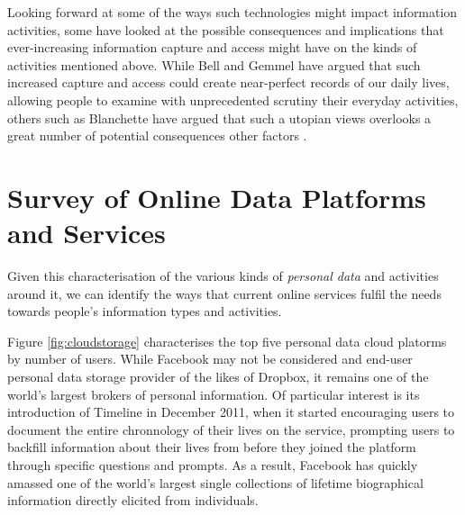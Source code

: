 \documentclass[runningheads,a4paper]{llncs}
\begin{document}
Looking forward at some of the ways such technologies might impact information activities, some have looked at the possible consequences and implications that ever-increasing information capture and access might have on the kinds of activities mentioned above.  While Bell and Gemmel have argued \cite{totalrecall} that such increased capture and access could create near-perfect records of our daily lives, allowing people to examine with unprecedented scrutiny their everyday activities, others such as Blanchette have argued that such a utopian views overlooks a great number of potential consequences other factors \cite{blanchette}. 



\section{Survey of Online Data Platforms and Services}

Given this characterisation of the various kinds of \emph{personal data} and activities around it, we can identify the ways that current online services fulfil the needs towards people's information types and activities.

Figure \ref{fig:cloudstorage} characterises the top five personal data cloud platorms by number of users. While Facebook may not be considered and end-user personal data storage provider of the likes of Dropbox, it remains one of the world's largest brokers of personal information.  Of particular interest is its introduction of Timeline in December 2011, when it started encouraging users to document the entire chronnology of their lives on the service, prompting users to backfill information about their lives from before they joined the platform through specific questions and prompts.  As a result, Facebook has quickly amassed one of the world's largest single collections of lifetime biographical information directly elicited from individuals.
\end{document}

